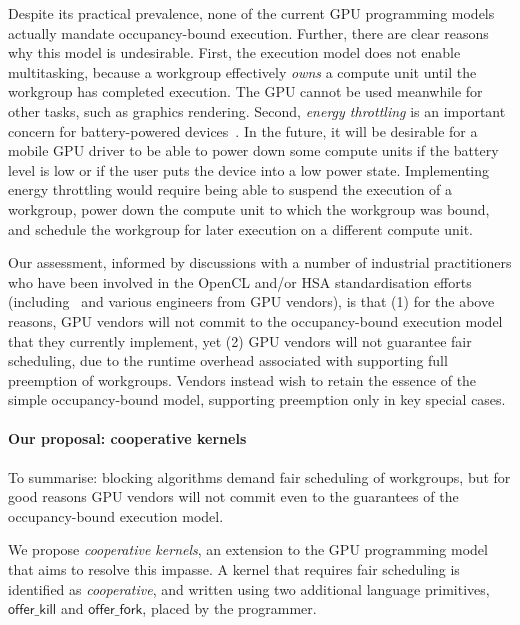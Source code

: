 \documentclass[numbers,nocopyrightspace,10pt]{sigplanconf}
\newcommand{\offerfork}{\mathsf{offer\_fork}}
\newcommand{\offerkill}{\mathsf{offer\_kill}}
\begin{document}
Despite its practical prevalence, none of the current GPU programming
models actually mandate occupancy-bound execution.  Further, there are
clear reasons why this model is undesirable.
First, the execution model does not enable
multitasking, because a workgroup effectively \emph{owns} a compute
unit until the workgroup has completed execution.  The GPU cannot be used meanwhile for other
tasks, such as graphics rendering.
Second, \emph{energy throttling} is
an important concern for battery-powered devices~\cite{DBLP:journals/comsur/Vallina-RodriguezC13}.  In the future, it will be desirable for a mobile GPU driver to be able to
power down some compute units if the battery level is low or if
the user puts the device into a low power state.  Implementing energy
throttling would require being able to suspend the execution of a
workgroup, power down the compute unit to which the workgroup was
bound, and schedule the workgroup for later execution on a different
compute unit.

Our assessment, informed by discussions with a number of industrial
practitioners who have been involved in the OpenCL and/or HSA
standardisation efforts
(including~\cite{PersonalCommunicationRichards,PersonalCommunicationHowes}
and various engineers from GPU vendors), is that (1) for the above reasons, GPU vendors will
not commit to the occupancy-bound execution model that they currently
implement,
yet (2) GPU vendors will not guarantee fair scheduling, due to the
runtime overhead associated with supporting full preemption of
workgroups.  Vendors instead wish to
retain the essence of the simple occupancy-bound model, supporting preemption
only in key special cases.


\paragraph{Our proposal: cooperative kernels}
%
To summarise: blocking algorithms
demand fair scheduling of workgroups, but for good reasons
GPU vendors will not commit even to the guarantees of the
occupancy-bound execution model.

We propose \emph{cooperative kernels}, an extension to the GPU
programming model that aims to resolve this impasse.  A kernel
that requires fair scheduling is identified as \emph{cooperative}, and written using two additional
language primitives, $\offerkill$ and $\offerfork$, placed by the programmer.
\end{document}
